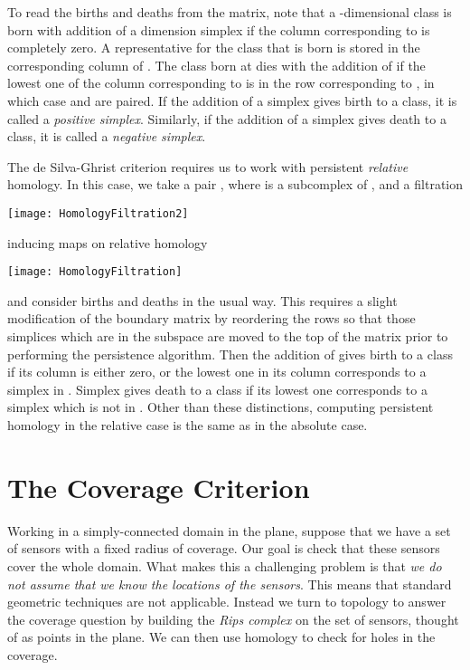 \documentclass[10pt,twocolumn]{article} \usepackage{amsmath,epsf,amssymb,cite,pifont,amsthm, mathrsfs,epsfig,  bbm, amsthm,  setspace}
\renewcommand{\1}{\mathbbm{1}}
\begin{document}
To read the births and deaths from the matrix, note that a -dimensional class is born with addition of a
dimension  simplex  if the column corresponding to  is completely zero.
A representative for the class that is born is stored in the corresponding column of .
The class born at  dies with the addition of  if the lowest one of the column corresponding to
 is in the row corresponding to ,
in which case  and  are paired.
If the addition of a simplex  gives birth to a class, it is called a \textit{positive simplex}.
Similarly, if the addition of a simplex  gives death to a class, it is called a \textit{negative simplex}.

The de Silva-Ghrist criterion requires us to work with persistent \textit{relative} homology.
In this case, we take a pair , where  is a subcomplex of , and a filtration
\begin{center}
 \texttt{[image: HomologyFiltration2]}
\end{center}
inducing maps on relative homology
\begin{center}
 \texttt{[image: HomologyFiltration]}
\end{center}
and consider births and deaths in the usual way.
This requires a slight modification of the boundary matrix by reordering the rows so that those
simplices which are in the subspace  are moved to the top of the matrix prior to performing the persistence algorithm.
Then the addition of  gives birth to a class if its column is either zero,
or the lowest one in its column corresponds to a simplex in .
Simplex  gives death to a class if its lowest one corresponds to a simplex which is not in .
Other than these distinctions, computing persistent homology in the relative case is the same as in the absolute case.


\section{The Coverage Criterion}\label{S: Coverage Criterion}

Working in a simply-connected domain in the plane,
suppose that we have a set of sensors with a fixed radius of coverage.
Our goal is check that these sensors cover the whole domain.
What makes this a challenging problem is that
{\em we do not assume that we know the locations of the sensors}.
This means that standard geometric techniques are not applicable.
Instead we turn to topology to answer the coverage question by building
the {\em Rips complex} on the set of sensors,
thought of as points in the plane.
We can then use homology to check for holes in the coverage.
\end{document}
